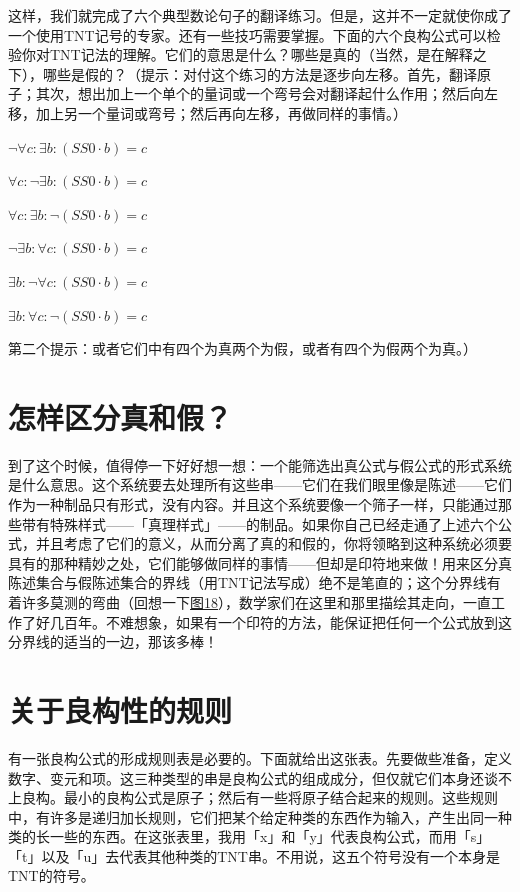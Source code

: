 \documentclass[
  12pt,
  twoside,
  openright,
  oldfontcommands,
]{memoir}
\begin{document}
这样，我们就完成了六个典型数论句子的翻译练习。但是，这并不一定就使你成了一个使用TNT记号的专家。还有一些技巧需要掌握。下面的六个良构公式可以检验你对TNT记法的理解。它们的意思是什么？哪些是真的（当然，是在解释之下），哪些是假的？（提示：对付这个练习的方法是逐步向左移。首先，翻译原子；其次，想出加上一个单个的量词或一个弯号会对翻译起什么作用；然后向左移，加上另一个量词或弯号；然后再向左移，再做同样的事情。）

$\lnot \forall c:\exists b:(SS0\cdot b)=c$

$\forall c:\lnot \exists b:(SS0\cdot b)=c$

$\forall c:\exists b:\lnot (SS0\cdot b)=c$

$\lnot \exists b:\forall c:(SS0\cdot b)=c$

$\exists b:\lnot \forall c:(SS0\cdot b)=c$

$\exists b:\forall c:\lnot (SS0\cdot b)=c$

第二个提示：或者它们中有四个为真两个为假，或者有四个为假两个为真。）

\section{怎样区分真和假？}

到了这个时候，值得停一下好好想一想：一个能筛选出真公式与假公式的形式系统是什么意思。这个系统要去处理所有这些串------它们在我们眼里像是陈述------它们作为一种制品只有形式，没有内容。并且这个系统要像一个筛子一样，只能通过那些带有特殊样式------「真理样式」------的制品。如果你自己已经走通了上述六个公式，并且考虑了它们的意义，从而分离了真的和假的，你将领略到这种系统必须要具有的那种精妙之处，它们能够做同样的事情------但却是印符地来做！用来区分真陈述集合与假陈述集合的界线（用TNT记法写成）绝不是笔直的；这个分界线有着许多莫测的弯曲（回想一下\hyperref[fig:18]{图18}），数学家们在这里和那里描绘其走向，一直工作了好几百年。不难想象，如果有一个印符的方法，能保证把任何一个公式放到这分界线的适当的一边，那该多棒！

\section{关于良构性的规则}

有一张良构公式的形成规则表是必要的。下面就给出这张表。先要做些准备，定义数字、变元和项。这三种类型的串是良构公式的组成成分，但仅就它们本身还谈不上良构。最小的良构公式是原子；然后有一些将原子结合起来的规则。这些规则中，有许多是递归加长规则，它们把某个给定种类的东西作为输入，产生出同一种类的长一些的东西。在这张表里，我用「x」和「y」代表良构公式，而用「s」\,「t」以及「u」去代表其他种类的TNT串。不用说，这五个符号没有一个本身是TNT的符号。
\end{document}
